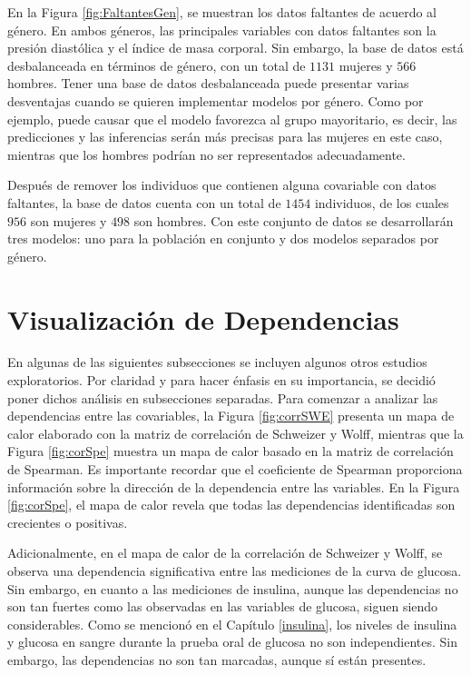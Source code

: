En la Figura \ref{fig:FaltantesGen}, se muestran los datos faltantes de acuerdo al género. En ambos géneros, las principales variables con datos faltantes son la presión diastólica y el índice de masa corporal. Sin embargo, la base de datos está desbalanceada en términos de género, con un total de $1131$ mujeres y $566$ hombres. Tener una base de datos desbalanceada puede presentar varias desventajas cuando se quieren implementar modelos por género. Como por ejemplo, puede causar que el modelo favorezca al grupo mayoritario, es decir, las predicciones y las inferencias serán más precisas para las mujeres en este caso, mientras que los hombres podrían no ser representados adecuadamente.

Después de remover los individuos que contienen alguna covariable con datos faltantes, la base de datos cuenta con un total de $1454$ individuos, de los cuales $956$ son mujeres y $498$ son hombres. Con este conjunto de datos se desarrollarán tres modelos: uno para la población en conjunto y dos modelos separados por género.


\section{Visualización de Dependencias}

En algunas de las siguientes subsecciones se incluyen algunos otros estudios exploratorios. Por claridad y para hacer énfasis en su importancia, se decidió poner dichos análisis en subsecciones separadas. Para comenzar a analizar las dependencias entre las covariables, la Figura \ref{fig:corrSWE} presenta un mapa de calor elaborado con la matriz de correlación de Schweizer y Wolff, mientras que la Figura \ref{fig:corSpe} muestra un mapa de calor basado en la matriz de correlación de Spearman. Es importante recordar que el coeficiente de Spearman proporciona información sobre la dirección de la dependencia entre las variables. En la Figura \ref{fig:corSpe}, el mapa de calor revela que todas las dependencias identificadas son crecientes o positivas.

Adicionalmente, en el mapa de calor de la correlación de Schweizer y Wolff, se observa una dependencia significativa entre las mediciones de la curva de glucosa. Sin embargo, en cuanto a las mediciones de insulina, aunque las dependencias no son tan fuertes como las observadas en las variables de glucosa, siguen siendo considerables. Como se mencionó en el Capítulo \ref{insulina}, los niveles de insulina y glucosa en sangre durante la prueba oral de glucosa no son independientes. Sin embargo, las dependencias no son tan marcadas, aunque sí están presentes. 

